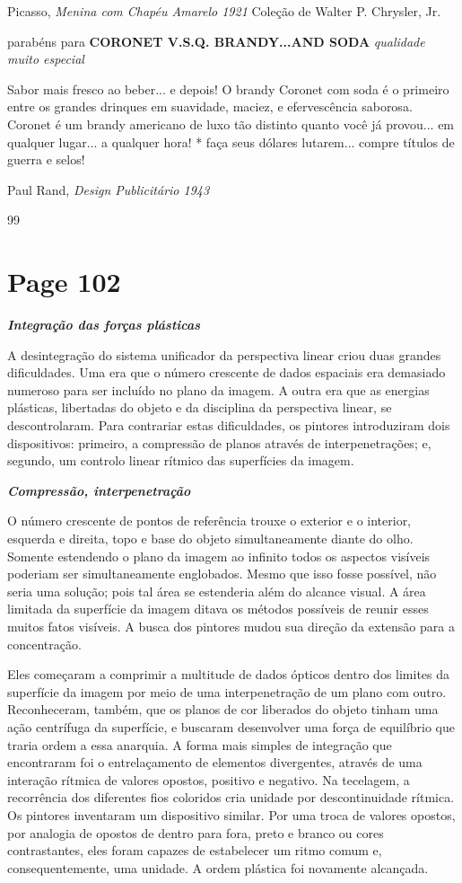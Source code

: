 \documentclass[a4paper]{article}
\begin{document}
Picasso,
\textit{Menina com Chapéu Amarelo 1921}
Coleção de Walter P. Chrysler, Jr.

parabéns para \textbf{CORONET V.S.Q. BRANDY...AND SODA}
\textit{qualidade muito especial}

Sabor mais fresco ao beber... e depois!
O brandy Coronet com soda é o primeiro entre os grandes
drinques em suavidade, maciez, e efervescência saborosa.
Coronet é um brandy americano de luxo tão distinto
quanto você já provou... em qualquer lugar... a qualquer hora!
* faça seus dólares lutarem... compre títulos de guerra e selos!

Paul Rand,
\textit{Design Publicitário 1943}

99

\newpage
\section*{Page 102}

\noindent\textbf{\textit{Integração das forças plásticas}}

A desintegração do sistema unificador da perspectiva linear criou duas grandes dificuldades. Uma era que o número crescente de dados espaciais era demasiado numeroso para ser incluído no plano da imagem. A outra era que as energias plásticas, libertadas do objeto e da disciplina da perspectiva linear, se descontrolaram. Para contrariar estas dificuldades, os pintores introduziram dois dispositivos: primeiro, a compressão de planos através de interpenetrações; e, segundo, um controlo linear rítmico das superfícies da imagem.

\noindent\textbf{\textit{Compressão, interpenetração}}

O número crescente de pontos de referência trouxe o exterior e o interior, esquerda e direita, topo e base do objeto simultaneamente diante do olho. Somente estendendo o plano da imagem ao infinito todos os aspectos visíveis poderiam ser simultaneamente englobados. Mesmo que isso fosse possível, não seria uma solução; pois tal área se estenderia além do alcance visual. A área limitada da superfície da imagem ditava os métodos possíveis de reunir esses muitos fatos visíveis. A busca dos pintores mudou sua direção da extensão para a concentração.

Eles começaram a comprimir a multitude de dados ópticos dentro dos limites da superfície da imagem por meio de uma interpenetração de um plano com outro. Reconheceram, também, que os planos de cor liberados do objeto tinham uma ação centrífuga da superfície, e buscaram desenvolver uma força de equilíbrio que traria ordem a essa anarquia. A forma mais simples de integração que encontraram foi o entrelaçamento de elementos divergentes, através de uma interação rítmica de valores opostos, positivo e negativo. Na tecelagem, a recorrência dos diferentes fios coloridos cria unidade por descontinuidade rítmica. Os pintores inventaram um dispositivo similar. Por uma troca de valores opostos, por analogia de opostos de dentro para fora, preto e branco ou cores contrastantes, eles foram capazes de estabelecer um ritmo comum e, consequentemente, uma unidade. A ordem plástica foi novamente alcançada.
\end{document}
